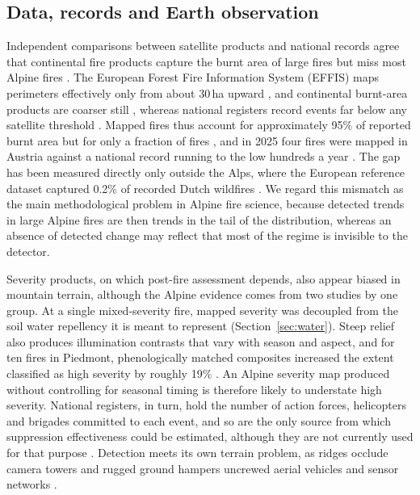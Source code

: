 \documentclass[11pt,a4paper]{article}
\begin{document}
\subsection{Data, records and Earth observation}
\label{sec:data}

Independent comparisons between satellite products and national records agree that continental fire products capture the burnt area of large fires but miss most Alpine fires \citep{jrc_advance_2026, beloiu_climatedriven_2026, papathomakohle_towards_2025, jones_global_2022, stoof_temperate_2024}. The European Forest Fire Information System (EFFIS) maps perimeters effectively only from about 30\,ha upward \citep{beloiu_climatedriven_2026}, and continental burnt-area products are coarser still \citep{forrest_understanding_2024}, whereas national registers record events far below any satellite threshold \citep{papathomakohle_towards_2025}. Mapped fires thus account for approximately 95\% of reported burnt area but for only a fraction of fires \citep{jrc_advance_2026}, and in 2025 four fires were mapped in Austria against a national record running to the low hundreds a year \citep{jrc_advance_2026, papathomakohle_towards_2025}. The gap has been measured directly only outside the Alps, where the European reference dataset captured 0.2\% of recorded Dutch wildfires \citep{stoof_temperate_2024}. We regard this mismatch as the main methodological problem in Alpine fire science, because detected trends in large Alpine fires are then trends in the tail of the distribution, whereas an absence of detected change may reflect that most of the regime is invisible to the detector.

Severity products, on which post-fire assessment depends, also appear biased in mountain terrain, although the Alpine evidence comes from two studies by one group. At a single mixed-severity fire, mapped severity was decoupled from the soil water repellency it is meant to represent \citep{negri_wildfire_2026} (Section~\ref{sec:water}). Steep relief also produces illumination contrasts that vary with season and aspect, and for ten fires in Piedmont, phenologically matched composites increased the extent classified as high severity by roughly 19\% \citep{morresi_mapping_2022}. An Alpine severity map produced without controlling for seasonal timing is therefore likely to understate high severity. National registers, in turn, hold the number of action forces, helicopters and brigades committed to each event, and so are the only source from which suppression effectiveness could be estimated, although they are not currently used for that purpose \citep{muller_forest_2020}. Detection meets its own terrain problem, as ridges occlude camera towers and rugged ground hampers uncrewed aerial vehicles and sensor networks \citep{muller_forest_2020, mohapatra_early_2022}.
\end{document}
